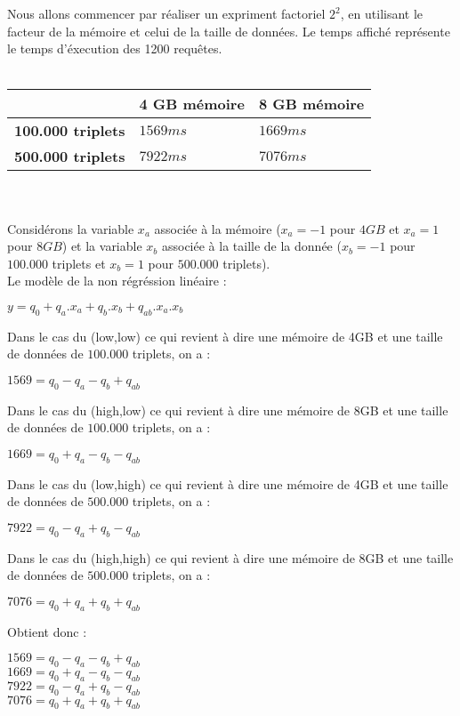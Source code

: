 \documentclass[12pt]{report}
\begin{document}
Nous allons commencer par réaliser un expriment factoriel $2^2$, en utilisant le facteur de la mémoire et celui de la taille de données. Le temps affiché représente le temps d'éxecution des 1200 requêtes.
\\\\
\begin{tabular}{|>{\centering\arraybackslash}p{5cm}|>{\centering\arraybackslash}p{5cm}|>{\centering\arraybackslash}p{5cm}|}
  \hline
  & \bf 4 GB mémoire & \bf 8 GB mémoire  \\
  \hline
  \bf 100.000 triplets & $1569 ms$ & $1669 ms$ \\
  \hline
  \bf 500.000 triplets & $7922 ms$  & $7076 ms$  \\
  \hline
\end{tabular}
\\\\
Considérons la variable $x_a$ associée à la mémoire ($x_a = -1$ pour $4GB$ et $x_a = 1$ pour $8GB$) et la variable $x_b$ associée à la taille de la donnée ($x_b = -1$ pour $100.000$ triplets et $x_b = 1$ pour $500.000$ triplets).\\
Le modèle de la non régréssion linéaire :
\begin{center}
  $y=q_0+q_a.x_a+q_b.x_b+q_{ab}.x_a.x_b$
\end{center}
Dans le cas du (low,low) ce qui revient à dire une mémoire de 4GB et une taille de données de $100.000$ triplets, on a :
\begin{center}
  $1569=q_0-q_a-q_b+q_{ab}$
\end{center}
Dans le cas du (high,low) ce qui revient à dire une mémoire de 8GB et une taille de données de $100.000$ triplets, on a :
\begin{center}
  $1669=q_0+q_a-q_b-q_{ab}$
\end{center}
Dans le cas du (low,high) ce qui revient à dire une mémoire de 4GB et une taille de données de $500.000$ triplets, on a :
\begin{center}
  $7922=q_0-q_a+q_b-q_{ab}$
\end{center}
Dans le cas du (high,high) ce qui revient à dire une mémoire de 8GB et une taille de données de $500.000$ triplets, on a :
\begin{center}
  $7076=q_0+q_a+q_b+q_{ab}$
\end{center}
Obtient donc :
\begin{center}
  $1569=q_0-q_a-q_b+q_{ab}$\\
  $1669=q_0+q_a-q_b-q_{ab}$\\
  $7922=q_0-q_a+q_b-q_{ab}$\\
  $7076=q_0+q_a+q_b+q_{ab}$
\end{center}
\end{document}
